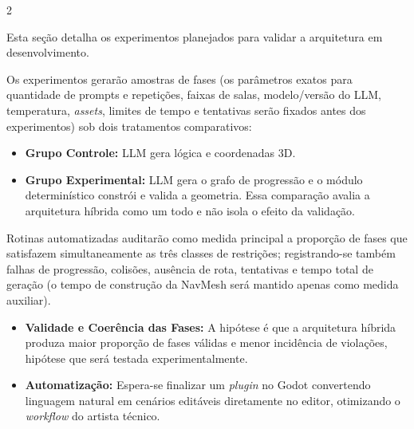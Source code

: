 \begin{paracol}{2}

{\fBody
Esta seção detalha os experimentos planejados para validar a arquitetura em desenvolvimento.

\vspace{3.5mm}
\par
\vspace{2mm}

Os experimentos gerarão amostras de fases (os parâmetros exatos para quantidade de prompts e repetições, faixas de salas, modelo/versão do LLM, temperatura, \textit{assets}, limites de tempo e tentativas serão fixados antes dos experimentos) sob dois tratamentos comparativos:

\begin{itemize}[leftmargin=16pt, itemsep=3pt, label={\color{sicverde}\faAngleRight}]
  \item \textbf{Grupo Controle:} LLM gera lógica e coordenadas 3D.
  \item \textbf{Grupo Experimental:} LLM gera o grafo de progressão e o módulo determinístico constrói e valida a geometria. Essa comparação avalia a arquitetura híbrida como um todo e não isola o efeito da validação.
\end{itemize}

Rotinas automatizadas auditarão como medida principal a proporção de fases que satisfazem simultaneamente as três classes de restrições; registrando-se também falhas de progressão, colisões, ausência de rota, tentativas e tempo total de geração (o tempo de construção da NavMesh será mantido apenas como medida auxiliar).

\vspace{3.5mm}
\par
\vspace{2mm}

\begin{itemize}[leftmargin=16pt, itemsep=3pt, label={\color{sicverde}\faAngleRight}]
  \item \textbf{Validade e Coerência das Fases:} A hipótese é que a arquitetura híbrida produza maior proporção de fases válidas e menor incidência de violações, hipótese que será testada experimentalmente.
  \item \textbf{Automatização:} Espera-se finalizar um \textit{plugin} no Godot convertendo linguagem natural em cenários editáveis diretamente no editor, otimizando o \textit{workflow} do artista técnico.
\end{itemize}
}\par


\end{paracol}
